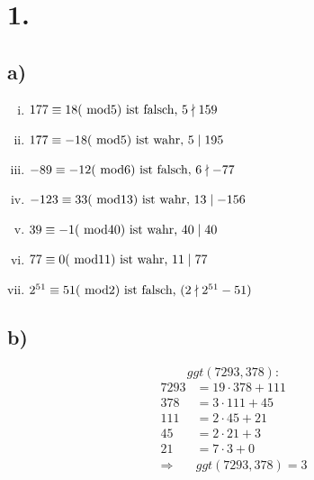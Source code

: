 \documentclass[a4paper]{scrartcl}
\title{\titleinfo}
\author{Arne Struck 6326505}
\date{\today}
\begin{document}
\maketitle
\notag
\section{1.}
	\subsection{a)}
	\begin{enumerate}[(i)]
		\item 
		\(
			177\equiv 18 (\text{ mod} 5) 
			\text{ ist falsch, } 5\nmid 159 \\
		\)
		\item
		\(
			177\equiv -18 (\text{ mod} 5)
			\text{ ist wahr, } 5\mid 195 \\
		\)
		\item
		\(
			-89\equiv -12 (\text{ mod} 6)
			\text{ ist falsch, } 6\nmid -77 \\
		\)
		\item
		\(
			-123\equiv 33 (\text{ mod} 13)
			\text{ ist wahr, } 13\mid -156 \\
		\)
		\item
		\(
			39\equiv -1 (\text{ mod} 40)
			\text{ ist wahr, } 40\mid 40 \\
		\)
		\item
		\(
			77\equiv 0 (\text{ mod} 11)
			\text{ ist wahr, } 11\mid 77 \\
		\)
		\item
		\(
			2^{51}\equiv 51 (\text{ mod} 2)
			\text{ ist falsch, } (2\nmid 2^{51}-51) \\
		\)
	\end{enumerate}
	
	\subsection{b)}
		\[ggt(7293,378):\]
		\begin{align}
			7293 &= 19\cdot 378+111 \\
			 378 &= 3\cdot 111+45 \\
			 111 &= 2\cdot 45 +21 \\
			  45 &=2\cdot 21 + 3 \\
			  21 &=7\cdot 3+0 \\
			\Rightarrow &ggt(7293,378)=3		
		\end{align}
	
\end{document}
